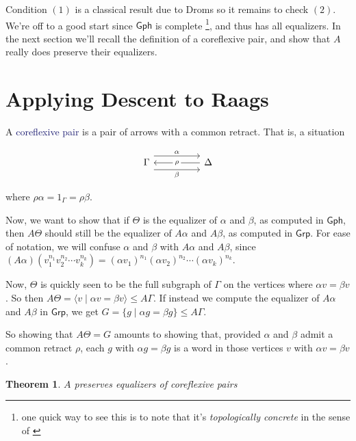 \documentclass[12pt]{article}
\newtheorem{thm}{Theorem}
\theoremstyle{definition}
\theoremstyle{theorem}
\newcommand*{\catFont}[1]{\mathsf{#1}}
\newcommand{\Grp}{\catFont{Grp}}
\newcommand*{\important}[1]{\textcolor{MidnightBlue}{#1}}
\begin{document}
Condition $(1)$ is a classical result due to Droms 
\cite{dromsIsomorphismsGraphGroups1987}
so it remains to check $(2)$. We're off to a good start since $\mathsf{Gph}$
is complete%
\footnote{one quick way to see this is to note that it's \emph{topologically concrete}
in the sense of \cite{adamekAbstractConcreteCategories2009}}, and thus has all equalizers. 
In the next section we'll recall
the definition of a coreflexive pair, and show that $A$ really does 
preserve their equalizers.

\section{Applying Descent to Raags}
\label{proof}

A \important{coreflexive pair} is a pair of arrows with a common retract. 
That is, a situation

\[\begin{tikzcd}
	\Gamma && \Delta
	\arrow["\alpha", shift left=3, from=1-1, to=1-3]
	\arrow["\beta"', shift right=3, from=1-1, to=1-3]
	\arrow["\rho"{description}, from=1-3, to=1-1]
\end{tikzcd}\]

where $\rho \alpha = 1_\Gamma = \rho \beta$.

Now, we want to show that if $\Theta$ is the equalizer of $\alpha$ and $\beta$,
as computed in $\mathsf{Gph}$, 
then $A\Theta$ should still be the equalizer of $A \alpha$ and $A \beta$, 
as computed in $\mathsf{Grp}$.
For ease of notation, we will confuse $\alpha$ and $\beta$ with $A \alpha$
and $A \beta$, since 
$(A\alpha)(v_1^{n_1} v_2^{n_2} \cdots v_k^{n_k}) = (\alpha v_1)^{n_1} (\alpha v_2)^{n_2} \cdots (\alpha v_k)^{n_k}$.

Now, $\Theta$ is quickly seen to be the full subgraph of $\Gamma$
on the vertices where $\alpha v = \beta v$. 
So then $A\Theta = \langle v \mid \alpha v = \beta v \rangle \leq A \Gamma$.
If instead we compute the equalizer of $A \alpha$ and $A \beta$ in $\Grp$,
we get $G = \{ g \mid \alpha g = \beta g \} \leq A\Gamma$.

So showing that $A \Theta = G$ amounts to showing that, provided $\alpha$ 
and $\beta$ admit a common retract $\rho$, each $g$ 
with $\alpha g = \beta g$ is a word in those vertices $v$ with $\alpha v = \beta v$.

\begin{thm}
    $A$ preserves equalizers of coreflexive pairs
\end{thm}
\end{document}
